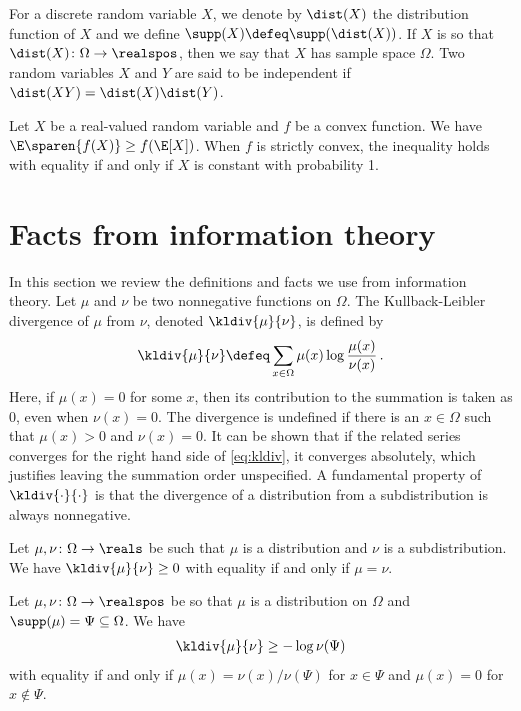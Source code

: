 For a discrete random variable $X$, we denote by
$\dist(X)$ the distribution function of $X$ and
we define $\supp(X)\defeq\supp(\dist(X))$. 
If $X$ is so that $\dist(X)\colon\Omega\to\realspos$,
then we say that $X$ has sample space $\Omega$.
Two 
random variables $X$ and $Y$ are said to be 
independent if $\dist(XY) =\dist(X)\dist(Y)$.

\begin{lemma}
\label{lem:jensen}
Let $X$ be a real-valued random variable and
$f$ be a convex function. We have
$\E\sparen{f(X)} \ge f(\E[X])$. When
$f$ is strictly convex, the inequality holds
with equality if and only if $X$ is constant
with probability 1.
\end{lemma}

\section{Facts from information theory}
\label{sec:prelim:info}
In this section we review the definitions and 
facts we use from information theory.
Let $\mu$ and $\nu$ be two 
nonnegative functions on $\Omega$.
The Kullback-Leibler divergence \cite{Wald1945, KullbackL1951}
of $\mu$ from $\nu$,
denoted $\kldiv{\mu}{\nu}$, is defined by
%
\begin{align}
\label{eq:kldiv}
  \kldiv{\mu}{\nu} \defeq \sum_{x\in \Omega}
      \mu(x)\log\frac{\mu(x)}{\nu(x)}\,.
\end{align}
%
Here, if $\mu(x)=0$ for some $x$, then its contribution
to the summation is taken as 0, even when $\nu(x)=0$.
The divergence is undefined if there is an
$x\in \Omega$ such that $\mu(x)>0$ and
$\nu(x)=0$.
It can be shown that if the related series 
converges for the right hand side of \autoref{eq:kldiv},
it converges absolutely, 
which justifies leaving the summation order unspecified.
A fundamental property of 
$\kldiv{\cdot}{\cdot}$ is that
the divergence of a distribution from a subdistribution 
is always nonnegative.
\begin{lemma}
\label{lem:gibbs}
Let $\mu,\nu\colon\Omega\to\reals$ be such that $\mu$ is a
distribution and $\nu$ is a subdistribution.
We have $\kldiv{\mu}{\nu}\ge 0$ with equality if and
only if $\mu=\nu$.
\end{lemma}
\begin{lemma}
\label{lem:klcond}
Let $\mu,\nu\colon\Omega\to\realspos$ be so that
$\mu$ is a distribution on $\Omega$ and 
$\supp(\mu) = \Psi\subseteq\Omega$. We have
\begin{align*}
\kldiv{\mu}{\nu}\ge -\log \nu(\Psi)
\end{align*}
with equality if and only if $\mu(x) = \nu(x)/\nu(\Psi)$ for
$x\in\Psi$ and $\mu(x) = 0$ for $x\notin\Psi$.
\end{lemma}
